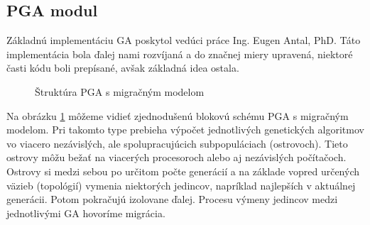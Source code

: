 \subsection{PGA modul}
Základnú implementáciu GA poskytol vedúci práce Ing. Eugen Antal, PhD.
Táto implementácia bola ďalej nami rozvíjaná a do značnej miery upravená, niektoré časti kódu boli prepísané, avšak základná idea ostala.

\begin{figure}[!htbp]
  \centering
  
  \caption{Štruktúra PGA s migračným modelom}
  \label{img:pga}
\end{figure}

Na obrázku \ref{img:pga} môžeme vidieť zjednodušenú blokovú schému PGA s migračným modelom.
Pri takomto type prebieha výpočet jednotlivých genetických algoritmov vo viacero nezávislých, ale spolupracujúcich subpopuláciach (ostrovoch).
Tieto ostrovy môžu bežať na viacerých procesoroch alebo aj nezávislých počítačoch.
Ostrovy si medzi sebou po určitom počte generácií a na základe vopred určených väzieb (topológií) vymenia niektorých jedincov,
napríklad najlepších v aktuálnej generácii. Potom pokračujú izolovane ďalej.
Procesu výmeny jedincov medzi jednotlivými GA hovoríme migrácia.

